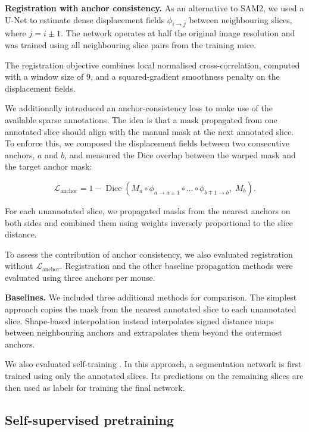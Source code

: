 \documentclass{article}
\begin{document}
\textbf{Registration with anchor consistency.}
As an alternative to SAM2, we used a U-Net to estimate dense displacement fields $\phi_{i\to j}$ between neighbouring slices, where $j=i\pm1$. The network operates at half the original image resolution and was trained using all neighbouring slice pairs from the training mice.

The registration objective combines local normalised cross-correlation, computed with a window size of 9, and a squared-gradient smoothness penalty on the displacement fields.

We additionally introduced an anchor-consistency loss to make use of the available sparse annotations. The idea is that a mask propagated from one annotated slice should align with the manual mask at the next annotated slice. To enforce this, we composed the displacement fields between two consecutive anchors, $a$ and $b$, and measured the Dice overlap between the warped mask and the target anchor mask:

\begin{equation}
\mathcal{L}_{\text{anchor}} =
1 - \operatorname{Dice}\!\left(
M_a \circ \phi_{a\to a\pm1}
\circ \dots \circ \phi_{b\mp1\to b},
\; M_b
\right).
\end{equation}

For each unannotated slice, we propagated masks from the nearest anchors on both sides and combined them using weights inversely proportional to the slice distance.

To assess the contribution of anchor consistency, we also evaluated registration without $\mathcal{L}_{\text{anchor}}$. Registration and the other baseline propagation methods were evaluated using three anchors per mouse.

\textbf{Baselines.}
We included three additional methods for comparison. The simplest approach copies the mask from the nearest annotated slice to each unannotated slice. Shape-based interpolation \cite{raya1990shape} instead interpolates signed distance maps between neighbouring anchors and extrapolates them beyond the outermost anchors.

We also evaluated self-training \cite{bai2017semi}. In this approach, a segmentation network is first trained using only the annotated slices. Its predictions on the remaining slices are then used as labels for training the final network.

\subsection{Self-supervised pretraining}
\label{sec:ssl}
\end{document}
